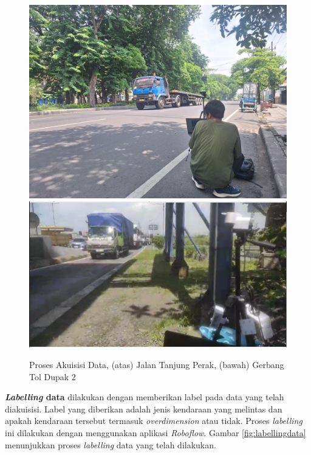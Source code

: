 \begin{figure}[htbp]
  \centering
  \includegraphics[scale=0.07]{gambar/bab3-acquisition-data-perak.png}
  \includegraphics[scale=0.4]{gambar/bab3-acquisition-data-dupak.png}
  \caption{Proses Akuisisi Data, (atas) Jalan Tanjung Perak, (bawah) Gerbang Tol Dupak 2}
  \label{fig:acquisitiondata}
\end{figure}

\textbf{\emph{Labelling} data} dilakukan dengan memberikan label pada data yang telah diakuisisi. Label yang diberikan adalah jenis kendaraan yang melintas dan apakah kendaraan tersebut termasuk \emph{overdimension} atau tidak. Proses \emph{labelling} ini dilakukan dengan menggunakan aplikasi \emph{Roboflow}. Gambar \ref{fig:labellingdata} menunjukkan proses \emph{labelling} data yang telah dilakukan.

